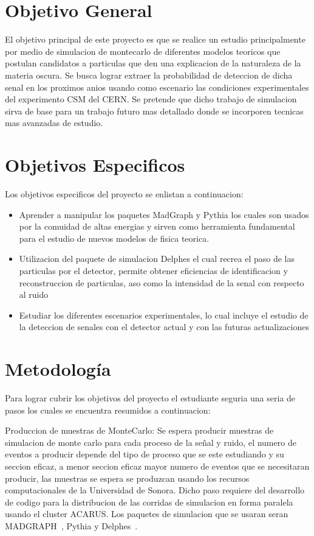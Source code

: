 \chapter{Objetivo General}

El objetivo principal de este proyecto es que se realice un estudio principalmente por medio de simulacion de montecarlo de diferentes modelos teoricos que postulan candidatos a particulas que den una explicacion de la naturaleza de la materia oscura.   Se busca lograr extraer la probabilidad de deteccion de dicha senal en los proximos anios usando como escenario las condiciones experimentales del experimento CSM del CERN.   Se pretende que dicho trabajo de simulacion sirva de base para un trabajo futuro mas detallado donde se incorporen tecnicas mas avanzadas de estudio. 


\chapter{Objetivos Especificos}

Los objetivos especificos del proyecto se enlistan a continuacion: 

\begin{itemize}
    \item Aprender a manipular los paquetes MadGraph y Pythia los cuales son usados por la comuidad de altas energias y sirven como herramienta fundamental para el estudio de nuevos modelos de fisica teorica.
    \item Utilizacion del paquete de simulacion Delphes el cual recrea el paso de las particulas por el detector, permite obtener eficiencias de identificacion y reconstruccion de particulas, aso como la intensidad de la senal con respecto al ruido
   \item Estudiar los diferentes escenarios experimentales, lo cual incluye el estudio de la deteccion de senales con el detector actual y con las futuras actualizaciones
\end{itemize}


\chapter{Metodología}

Para lograr cubrir los objetivos del proyecto el estudiante seguria una seria de pasos los cuales se encuentra resumidos a continuacion:

Produccion de muestras de MonteCarlo: Se espera producir muestras de simulacion de monte carlo para cada proceso de la se\~nal y ruido, el numero de eventos a producir depende del tipo de proceso que se este estudiando y su seccion eficaz, a menor seccion eficaz mayor numero de eventos que se necesitaran producir, las muestras se espera se produzcan usando los recursos computacionales de la Universidad de Sonora. Dicho paso requiere del desarrollo de codigo para la distribucion de las corridas de simulacion en forma paralela usando el cluster ACARUS. Los paquetes de simulacion que se usaran seran MADGRAPH~\cite{Alwall:2007st}, Pythia y Delphes~\cite{deFavereau2014}.


